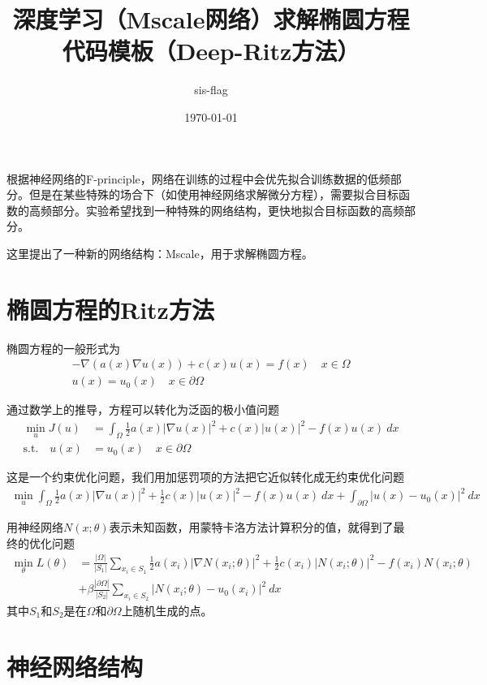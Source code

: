 \documentclass[12pt,a4paper]{article}
\title{深度学习（Mscale网络）求解椭圆方程代码模板（Deep-Ritz方法）}
\author{sis-flag}
\date{\today}
\begin{document}
\maketitle

根据神经网络的F-principle，网络在训练的过程中会优先拟合训练数据的低频部分。但是在某些特殊的场合下（如使用神经网络求解微分方程），需要拟合目标函数的高频部分。实验希望找到一种特殊的网络结构，更快地拟合目标函数的高频部分。

这里提出了一种新的网络结构：Mscale，用于求解椭圆方程。

\section*{椭圆方程的Ritz方法}

椭圆方程的一般形式为
\begin{align*}
-\nabla(a(x) \nabla u(x)) + c(x) u(x) = f(x) \quad x \in \Omega \\
u(x) = u_0(x) \quad x \in \partial \Omega
\end{align*}

通过数学上的推导，方程可以转化为泛函的极小值问题
\begin{align*}
\min_{u} J(u) & = \int_{\Omega} \frac{1}{2} a(x) |\nabla u(x)|^2 + c(x) |u(x)|^2 - f(x) u(x) \ dx \\
\text{s.t.} \quad u(x) & = u_0(x) \quad x \in \partial \Omega 
\end{align*}

这是一个约束优化问题，我们用加惩罚项的方法把它近似转化成无约束优化问题
\begin{align*}
\min_{u} \int_{\Omega} \frac{1}{2} a(x) |\nabla u(x)|^2 + \frac{1}{2} c(x) |u(x)|^2 - f(x) u(x) \ dx + \int_{\partial \Omega} |u(x) - u_0(x)|^2 \ dx
\end{align*}

用神经网络$N(x; \theta)$表示未知函数，用蒙特卡洛方法计算积分的值，就得到了最终的优化问题
\begin{align*}
\min_{\theta} L(\theta) & = \frac{|\Omega|}{|S_1|} \sum_{x_i \in S_1} \frac{1}{2} a(x_i) |\nabla N(x_i; \theta)|^2 + \frac{1}{2} c(x_i) |N(x_i; \theta)|^2 - f(x_i) N(x_i; \theta) \\
& + \beta \frac{|\partial \Omega|}{|S_2|} \sum_{x_i \in S_2} |N(x_i; \theta) - u_0(x_i)|^2 \ dx
\end{align*}
其中$S_1$和$S_2$是在$\Omega$和$\partial \Omega$上随机生成的点。

\section*{神经网络结构}
\end{document}
